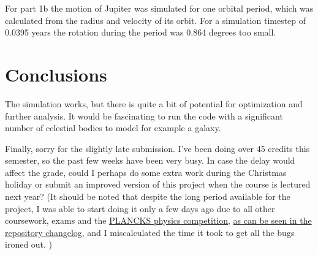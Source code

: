 \documentclass[a4paper]{article}
\begin{document}
For part 1b the motion of Jupiter was simulated for one orbital period, which was calculated from the radius and velocity of its orbit.
For a simulation timestep of 0.0395 years the rotation during the period was 0.864 degrees too small.


\FloatBarrier
\section{Conclusions}
The simulation works, but there is quite a bit of potential for optimization and further analysis.
It would be fascinating to run the code with a significant number of celestial bodies to model for example a galaxy.

Finally, sorry for the slightly late submission.
I've been doing over 45 credits this semester, so the past few weeks have been very busy.
In case the delay would affect the grade, could I perhaps do
some extra work during the Christmas holiday or submit an improved version of this project
when the course is lectured next year?
(It should be noted that despite the long period available for the project, I was able to start doing it only
a few days ago due to all other coursework, exams and the
\href{https://www.plancks.uk/london2020}{PLANCKS physics competition},
\href{https://github.com/AgenttiX/planetary-motion/commits/main}{as can be seen in the repository changelog},
and I miscalculated the time it took to get all the bugs ironed out.
)
\end{document}
